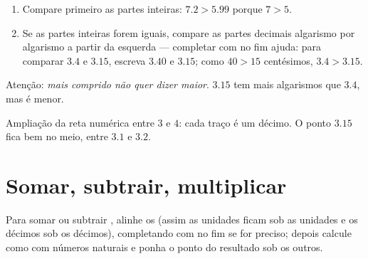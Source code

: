 \begin{method}\label{met:g6:decimals:compare}
\begin{enumerate}
  \item Compare primeiro as partes inteiras: $7.2 > 5.99$ porque
        $7 > 5$.
  \item Se as partes inteiras forem iguais, compare as partes decimais
        algarismo por algarismo a partir da esquerda --- completar com
         no fim ajuda: para comparar $3.4$ e $3.15$, escreva $3.40$
        e $3.15$; como $40 > 15$ centésimos, $3.4 > 3.15$.
\end{enumerate}
Atenção: \emph{mais comprido não quer dizer maior}. $3.15$ tem mais
algarismos que $3.4$, mas é menor.
\end{method}

\begin{omfigure}

{\small Ampliação da reta numérica entre $3$ e $4$: cada traço é um
décimo. O ponto $3.15$ fica bem no meio, entre $3.1$ e $3.2$.}
\end{omfigure}

\section{Somar, subtrair, multiplicar}

\begin{method}\label{met:g6:decimals:columns}
Para somar ou subtrair , alinhe os \emph{} (assim as unidades ficam sob as unidades e os décimos sob os
décimos), completando com  no fim se for preciso; depois calcule
como com números naturais e ponha o ponto do resultado sob os outros.
\end{method}

